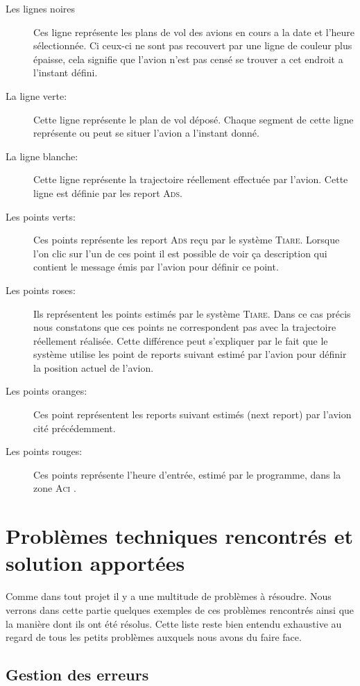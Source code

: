 \begin{description}
\item[Les lignes noires] Ces ligne représente les plans de vol des avions en cours a la date et l'heure sélectionnée. Ci ceux-ci ne sont pas recouvert par une ligne de couleur plus épaisse, cela signifie que l'avion n'est pas censé se trouver a cet endroit a l'instant défini. 
\item[La ligne verte:] Cette ligne représente le plan de vol déposé. Chaque segment de cette ligne représente ou peut se situer l'avion a l'instant donné.
\item[La ligne blanche:] Cette ligne représente la trajectoire réellement effectuée par l'avion. Cette ligne est définie par les report \textsc{Ads}.
\item[Les points verts:] Ces points représente les report \textsc{Ads} reçu par le système \textsc{Tiare}. Lorsque l'on clic sur l'un de ces point il est possible de voir ça description qui contient le message émis par l'avion pour définir ce point.
\item[Les points roses:] Ils représentent les points estimés par le système \textsc{Tiare}. Dans ce cas précis nous constatons que ces points ne correspondent pas avec la trajectoire réellement réalisée. Cette différence peut s'expliquer par le fait que le système utilise les point de reports suivant estimé par l'avion pour définir la position actuel de l'avion.
\item[Les points oranges:] Ces point représentent les reports suivant estimés (next report) par l'avion cité précédemment.
\item[Les points rouges:] Ces points représente l'heure d'entrée, estimé par le programme, dans la zone \textsc{Aci} . 
\end{description}




\section{Problèmes techniques rencontrés et solution apportées}
Comme dans tout projet il y a une multitude de problèmes à résoudre. Nous verrons dans cette partie quelques exemples de ces problèmes rencontrés ainsi que la manière dont ils ont été résolus. Cette liste reste bien entendu exhaustive au regard de tous les petits problèmes auxquels nous avons du faire face.

    \subsection{Gestion des erreurs}
